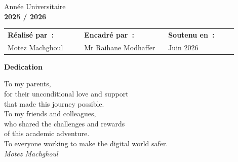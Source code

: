 \begin{titlepage}
\vfill

\noindent
\begin{minipage}[b]{0.28\textwidth}
  \hspace{1.15cm}
  {\scriptsize Année Universitaire}\\[2pt]
  {\Large\bfseries 2025 / 2026}
\end{minipage}%
\hfill
\begin{minipage}[b]{0.68\textwidth}
  \raggedleft
  \renewcommand{\arraystretch}{1.35}
  \begin{tabular}{@{} >{\raggedright\arraybackslash}p{0.31\linewidth}
                     >{\raggedright\arraybackslash}p{0.34\linewidth}
                     >{\raggedright\arraybackslash}p{0.28\linewidth} @{}}
    \textbf{Réalisé par~:} &
    \textbf{Encadré par~:} &
    \textbf{Soutenu en~:} \\[2pt]
    Motez Machghoul &
    Mr Raihane Modhaffer &
    Juin 2026 \\
  \end{tabular}
\end{minipage}

\vspace*{1.6cm}
\end{titlepage}
\nopagecolor

\clearpage
\thispagestyle{empty}
\vspace*{2.5cm}
\begin{center}
  {\LARGE\bfseries Dedication}
\end{center}
\vspace{1.5cm}
\begin{flushright}
\begin{minipage}{0.58\textwidth}
\large\itshape

To my parents,\\
for their unconditional love and support\\
that made this journey possible.\\[14pt]

To my friends and colleagues,\\
who shared the challenges and rewards\\
of this academic adventure.\\[14pt]

To everyone working to make the digital world safer.\\[20pt]

\normalfont\normalsize
\textit{Motez Machghoul}
\end{minipage}
\end{flushright}
\clearpage

